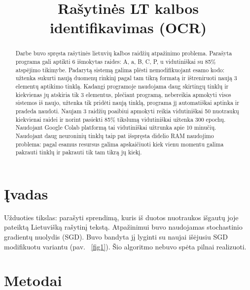 \documentclass[conference]{IEEEtran}
\begin{document}
\title{Rašytinės LT kalbos identifikavimas (OCR)}

\author{
}

\maketitle

\begin{abstract}
Darbe buvo spręsta rašytinės lietuvių kalbos raidžių atpažinimo problema.
Parašyta programa gali aptikti 6 išmokytas raides: A, a, B, C, P, u vidutiniškai su
85\% atspėjimo tikimybe. Padarytą sistemą galima plėsti nemodifikuojant esamo kodo:
užtenka sukurti naują duomenų rinkinį pagal tam tikrą formatą ir ištreniruoti naują
3 elementų aptikimo tinklą. Kadangi programoje naudojama daug skirtingų tinklų ir kiekvienas
jų atskiria tik 3 elementus, plečiant programą, nebereikia apmokyti visos sistemos iš naujo,
užtenka tik pridėti naują tinklą, programa jį automatiškai aptinka ir pradeda naudoti.
Naujam 3 raidžių poaibiui apmokyti reikia vidutiniškai 50 nuotraukų kiekvienai raidei ir
norint pasiekti 85\% tikslumą vidutiniškai užtenka 300 epochų. Naudojant Google Colab
platformą tai vidutiniškai užtrunka apie 10 minučių. Naudojant daug neuroninių tinklų
taip pat išspręsta didelio RAM naudojimo problema: pagal esamus resursus galima
apskaičiuoti kiek vienu momentu galima pakrauti tinklų ir pakrauti tik tam tikrą jų
kiekį.
\end{abstract}

\section{Įvadas}
Užduoties tikslas: parašyti sprendimą, kuris iš duotos
nuotraukos išgautų joje pateiktą Lietuvišką rašytinį tekstą.
Atpažinimui buvo naudojamas stochastinio gradientų nuolydis (SGD).
Buvo bandyta jį lyginti su naujai išėjusiu SGD modifikuotu variantu (pav. ~\ref{fig1}). Šio algoritmo nebuvo spėta pilnai realizuoti.

\section{Metodai}
\end{document}
